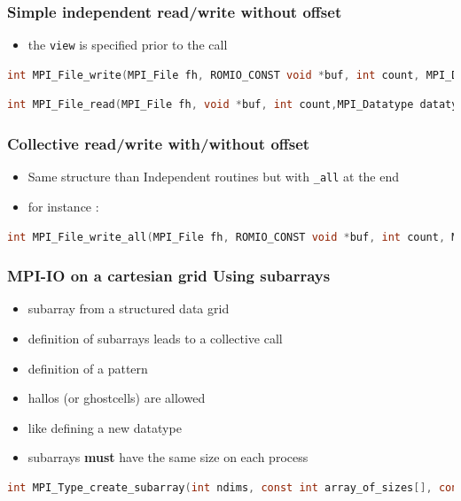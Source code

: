 \begin{frame}[containsverbatim]
\frametitle{Simple independent read/write without offset}
\begin{itemize}
	\item {the \texttt{view} is specified prior to the call }
\end{itemize}
\begin{lstlisting}[language=C,frame=lines]
int MPI_File_write(MPI_File fh, ROMIO_CONST void *buf, int count, MPI_Datatype datatype, MPI_Status *status)
\end{lstlisting}
\begin{lstlisting}[language=C,frame=lines]
int MPI_File_read(MPI_File fh, void *buf, int count,MPI_Datatype datatype, MPI_Status *status)
\end{lstlisting}
\end{frame}


\begin{frame}[containsverbatim]
\frametitle{Collective read/write with/without offset}
\begin{itemize}
	\item {Same structure than Independent routines but with \verb+_all+ at the end }
	\item {for instance : }
\end{itemize}
\begin{lstlisting}[language=C,frame=lines]
int MPI_File_write_all(MPI_File fh, ROMIO_CONST void *buf, int count, MPI_Datatype datatype, MPI_Status *status)
\end{lstlisting}
\end{frame}


\begin{frame}[containsverbatim]
\frametitle{MPI-IO on a cartesian grid Using subarrays}
\begin{itemize}
	\item {subarray from a structured data grid}
	\item {definition of subarrays leads to a collective call}
	\item {definition of a pattern}
	\item {hallos (or ghostcells) are allowed}
	\item {like defining a new datatype}
	\item {subarrays \textbf{must} have the same size on each process}
\end{itemize}
\begin{lstlisting}[language=C,frame=lines]
int MPI_Type_create_subarray(int ndims, const int array_of_sizes[], const int array_of_subsizes[], const int array_of_starts[], int order, MPI_Datatype oldtype, MPI_Datatype *newtype)
\end{lstlisting}
\end{frame}

